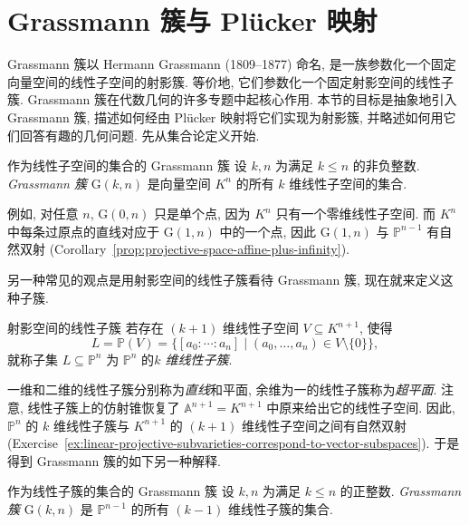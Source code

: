\section{Grassmann 簇与 Plücker 映射}\label{sec:grassmannians-and-plucker-maps}

Grassmann 簇以 Hermann Grassmann (1809--1877) 命名, 是一族参数化一个固定向量空间的线性子空间的射影簇. 等价地, 它们参数化一个固定射影空间的线性子簇. Grassmann 簇在代数几何的许多专题中起核心作用. 本节的目标是抽象地引入 Grassmann 簇, 描述如何经由 Plücker 映射将它们实现为射影簇, 并略述如何用它们回答有趣的几何问题. 先从集合论定义开始.

\begin{Definition}{作为线性子空间的集合的 Grassmann 簇}\leavevmode\label{def:grassmannian-as-set-of-vector-subspaces}
设 $k,n$ 为满足 $k\le n$ 的非负整数. \emph{Grassmann 簇} $\mathrm{G}(k,n)$ 是向量空间 $K^{n}$ 的所有 $k$ 维线性子空间的集合.
\end{Definition}

例如, 对任意 $n$, $\mathrm{G}(0,n)$ 只是单个点, 因为 $K^{n}$ 只有一个零维线性子空间. 而 $K^{n}$ 中每条过原点的直线对应于 $\mathrm{G}(1,n)$ 中的一个点, 因此 $\mathrm{G}(1,n)$ 与 $\mathbb{P}^{n-1}$ 有自然双射 (Corollary~\ref{prop:projective-space-affine-plus-infinity}).

另一种常见的观点是用射影空间的线性子簇看待 Grassmann 簇, 现在就来定义这种子簇.

\begin{Definition}{射影空间的线性子簇}\leavevmode\label{def:linear-subvariety-of-projective-space}
若存在 $(k+1)$ 维线性子空间 $V\subseteq K^{n+1}$, 使得
\[
  L=\mathbb{P}(V)=\{[a_{0}:\cdots:a_{n}]\mid(a_{0},\ldots,a_{n})\in V\setminus\{0\}\},
\]
就称子集 $L\subseteq\mathbb{P}^{n}$ 为 $\mathbb{P}^{n}$ 的\emph{$k$ 维线性子簇}.
\end{Definition}

一维和二维的线性子簇分别称为\emph{直线}和平面, 余维为一的线性子簇称为\emph{超平面}. 注意, 线性子簇上的仿射锥恢复了 $\mathbb{A}^{n+1}=K^{n+1}$ 中原来给出它的线性子空间. 因此, $\mathbb{P}^{n}$ 的 $k$ 维线性子簇与 $K^{n+1}$ 的 $(k+1)$ 维线性子空间之间有自然双射 (Exercise~\ref{ex:linear-projective-subvarieties-correspond-to-vector-subspaces}). 于是得到 Grassmann 簇的如下另一种解释.

\begin{Definition}{作为线性子簇的集合的 Grassmann 簇}\leavevmode\label{def:grassmannian-as-set-of-projective-subvarieties}
设 $k,n$ 为满足 $k\le n$ 的正整数. \emph{Grassmann 簇} $\mathrm{G}(k,n)$ 是 $\mathbb{P}^{n-1}$ 的所有 $(k-1)$ 维线性子簇的集合.
\end{Definition}

